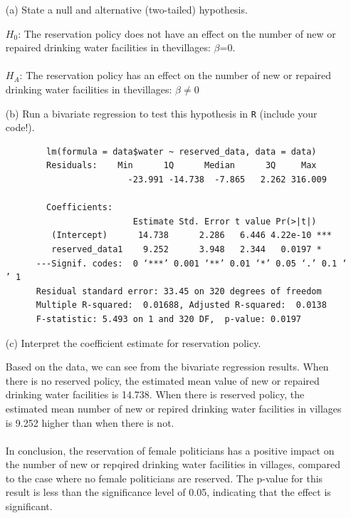 \documentclass[12pt,letterpaper]{article}
\begin{document}
\newpage
\begin{enumerate}
	\item [(a)] State a null and alternative (two-tailed) hypothesis. 
	
	\vspace{.15cm}
	\noindent 
	$H_0$: The reservation policy does not have an effect on the number of new or repaired drinking water facilities in thevillages: ${\beta}$=0.\\
	\\$H_A$: The reservation policy has an effect on the number of new or repaired drinking water facilities in thevillages: ${\beta}\neq$0\\
	
	\vspace{.6cm}
	\item [(b)] Run a bivariate regression to test this hypothesis in \texttt{R} (include your code!).
	
	
	
	\begin{verbatim}
		lm(formula = data$water ~ reserved_data, data = data)
		Residuals:    Min      1Q      Median      3Q     Max 
						-23.991 -14.738  -7.865   2.262 316.009 
		
		Coefficients: 
		                 Estimate Std. Error t value Pr(>|t|)    
		 (Intercept)      14.738      2.286   6.446 4.22e-10 ***
		 reserved_data1    9.252      3.948   2.344   0.0197 *  
	  ---Signif. codes:  0 ‘***’ 0.001 ‘**’ 0.01 ‘*’ 0.05 ‘.’ 0.1 ‘ ’ 1
	  Residual standard error: 33.45 on 320 degrees of freedom
	  Multiple R-squared:  0.01688,	Adjusted R-squared:  0.0138 
	  F-statistic: 5.493 on 1 and 320 DF,  p-value: 0.0197
	\end{verbatim}
	\vspace{.5cm}
	
	\vspace{6cm}
	\item [(c)] Interpret the coefficient estimate for reservation policy. 
	
	\vspace{.15cm}
	\noindent Based on the data, we can see from the bivariate regression results. When there is no reserved policy, the estimated mean value of new or repaired drinking water facilities is 14.738. When there is reserved policy, the estimated mean number of new or repired drinking water facilities in villages is 9.252 higher than when there is not.\\
	\\In conclusion, the reservation of female politicians has a positive impact on the number of new or repqired drinking water facilities in villages, compared to the case where no female politicians are reserved. The p-value for this result is less than the significance level of 0.05, indicating that the effect is significant.\\
	
\end{enumerate}
\end{document}

